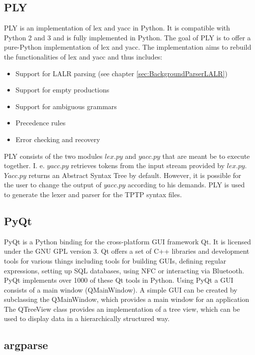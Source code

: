 \subsection{PLY}\label{sec:BackgroundPythonPLY}

\acf{PLY} is an implementation of lex and yacc in Python. It is compatible with Python 2 and 3 and is fully implemented in Python. The goal of \ac{PLY} is to offer a pure-Python implementation of lex and yacc. The implementation aims to rebuild the functionalities of lex and yacc and thus includes:
\begin{itemize}
\item Support for LALR parsing (see chapter \ref{sec:BackgroundParserLALR})
\item Support for empty productions
\item Support for ambiguous grammars 
\item Precedence rules
\item Error checking and recovery
\end{itemize}

\ac{PLY} consists of the two modules $lex.py$ and $yacc.py$ that are meant be to execute together. I. e. $yacc.py$ retrieves tokens from the input stream provided by $lex.py$. $Yacc.py$ returns an Abstract Syntax Tree by default. However, it is possible for the user to change the output of $yacc.py$ according to his demands. \cite{PLY}
PLY is used to generate the lexer and parser for the \ac{TPTP} syntax files.

\subsection{PyQt}\label{sec:BackgroundPytonPyQt}

PyQt is a Python binding for the cross-platform GUI framework Qt.
It is licensed under the GNU GPL version 3.
Qt offers a set of C++ libraries and development tools for various things including tools for building GUIs, defining regular expressions, setting up SQL databases, using NFC or interacting via Bluetooth.
PyQt implements over 1000 of these Qt tools in Python.
Using PyQt a GUI consists of a main window (QMainWindow).
A simple GUI can be created by subclassing the QMainWindow, which provides a main window for an application
The QTreeView class provides an implementation of a tree view, which can be used to display data in a hierarchically structured way. \cite{PyQt}

\subsection{argparse}\label{sec:BackgroundArgparse}

